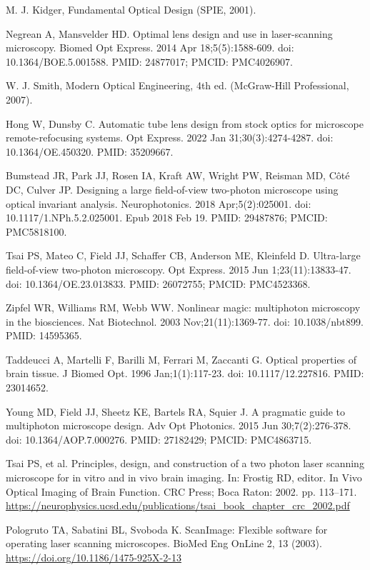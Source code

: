 \documentclass[10pt,letterpaper]{article}
\begin{document}
\begin{thebibliography}{10}
M. J. Kidger, Fundamental Optical Design (SPIE, 2001).

Negrean A, Mansvelder HD. Optimal lens design and use in laser-scanning microscopy. Biomed Opt Express. 2014 Apr 18;5(5):1588-609. doi: 10.1364/BOE.5.001588. PMID: 24877017; PMCID: PMC4026907.

W. J. Smith, Modern Optical Engineering, 4th ed. (McGraw-Hill Professional, 2007).

Hong W, Dunsby C. Automatic tube lens design from stock optics for microscope remote-refocusing systems. Opt Express. 2022 Jan 31;30(3):4274-4287. doi: 10.1364/OE.450320. PMID: 35209667.

Bumstead JR, Park JJ, Rosen IA, Kraft AW, Wright PW, Reisman MD, Côté DC, Culver JP. Designing a large field-of-view two-photon microscope using optical invariant analysis. Neurophotonics. 2018 Apr;5(2):025001. doi: 10.1117/1.NPh.5.2.025001. Epub 2018 Feb 19. PMID: 29487876; PMCID: PMC5818100.

Tsai PS, Mateo C, Field JJ, Schaffer CB, Anderson ME, Kleinfeld D. Ultra-large field-of-view two-photon microscopy. Opt Express. 2015 Jun 1;23(11):13833-47. doi: 10.1364/OE.23.013833. PMID: 26072755; PMCID: PMC4523368.

Zipfel WR, Williams RM, Webb WW. Nonlinear magic: multiphoton microscopy in the biosciences. Nat Biotechnol. 2003 Nov;21(11):1369-77. doi: 10.1038/nbt899. PMID: 14595365.

Taddeucci A, Martelli F, Barilli M, Ferrari M, Zaccanti G. Optical properties of brain tissue. J Biomed Opt. 1996 Jan;1(1):117-23. doi: 10.1117/12.227816. PMID: 23014652.

Young MD, Field JJ, Sheetz KE, Bartels RA, Squier J. A pragmatic guide to multiphoton microscope design. Adv Opt Photonics. 2015 Jun 30;7(2):276-378. doi: 10.1364/AOP.7.000276. PMID: 27182429; PMCID: PMC4863715.

Tsai PS, et al. Principles, design, and construction of a two photon laser scanning microscope for in vitro and in vivo brain imaging. In: Frostig RD, editor. In Vivo Optical Imaging of Brain Function. CRC Press; Boca Raton: 2002. pp. 113–171. \url{https://neurophysics.ucsd.edu/publications/tsai_book_chapter_crc_2002.pdf}

Pologruto TA, Sabatini BL, Svoboda K. ScanImage: Flexible software for operating laser scanning microscopes. BioMed Eng OnLine 2, 13 (2003). \url{https://doi.org/10.1186/1475-925X-2-13}


\end{thebibliography}
\end{document}
